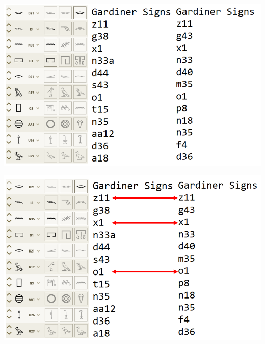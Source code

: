 \documentclass[unknownkeysallowed,usepdftitle=false, parskip=full]{beamer}
\newcommand{\secvariable}{nothing}
\begin{document}
\begin{frame}\label{\secvariable}

\begin{center}
\includegraphics[width=1.0\textwidth,keepaspectratio]{figure/GardinerCodes.PNG}
\end{center}

\end{frame}



\begin{frame}\label{\secvariable}

\begin{center}
\includegraphics[width=1.0\textwidth,keepaspectratio]{figure/matches.PNG}
\end{center}

\end{frame}
\end{document}
